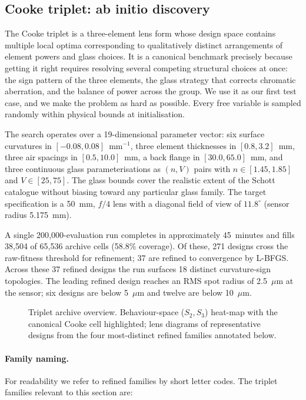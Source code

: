 \subsection{Cooke triplet: ab initio discovery}
\label{sec:results-triplet}

The Cooke triplet is a three-element lens form whose design space contains multiple local optima corresponding to qualitatively distinct arrangements of element powers and glass choices. It is a canonical benchmark precisely because getting it right requires resolving several competing structural choices at once: the sign pattern of the three elements, the glass strategy that corrects chromatic aberration, and the balance of power across the group. We use it as our first test case, and we make the problem as hard as possible. Every free variable is sampled randomly within physical bounds at initialisation.

The search operates over a 19-dimensional parameter vector: six surface curvatures in $[-0.08, 0.08]$~mm$^{-1}$, three element thicknesses in $[0.8, 3.2]$~mm, three air spacings in $[0.5, 10.0]$~mm, a back flange in $[30.0, 65.0]$~mm, and three continuous glass parameterisations as $(n, V)$ pairs with $n \in [1.45, 1.85]$ and $V \in [25, 75]$. The glass bounds cover the realistic extent of the Schott catalogue without biasing toward any particular glass family. The target specification is a 50~mm, $f/4$ lens with a diagonal field of view of $11.8^{\circ}$ (sensor radius 5.175~mm).

A single 200{,}000-evaluation run completes in approximately 45~minutes and fills 38{,}504 of 65{,}536 archive cells (58.8\% coverage). Of these, 271 designs cross the raw-fitness threshold for refinement; 37 are refined to convergence by L-BFGS. Across these 37 refined designs the run surfaces 18 distinct curvature-sign topologies. The leading refined design reaches an RMS spot radius of 2.5~$\mu$m at the sensor; six designs are below 5~$\mu$m and twelve are below 10~$\mu$m.

\begin{figure}[h]
    \centering
    \caption{Triplet archive overview. Behaviour-space ($S_2, S_3$) heat-map with the canonical Cooke cell highlighted; lens diagrams of representative designs from the four most-distinct refined families annotated below.}
    \label{fig:triplet-archive}
\end{figure}

\paragraph{Family naming.} For readability we refer to refined families by short letter codes. The triplet families relevant to this section are:

